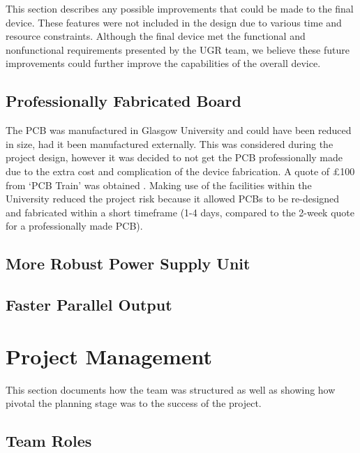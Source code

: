 \documentclass[a4paper,12pt]{article}
\begin{document}
This section describes any possible improvements that could be made to the final device. These features were not included in the design due to various time and resource constraints. Although the final device met the functional and nonfunctional requirements presented by the UGR team, we believe these future improvements could further improve the capabilities of the overall device.

\subsection{Professionally Fabricated Board}
\label{sec:future_improvement_1}

The PCB was manufactured in Glasgow University and could have been reduced in size, had it been manufactured externally. This was considered during the project design, however it was decided to not get the PCB professionally made due to the extra cost and complication of the device fabrication. A quote of £100 from ‘PCB Train’ was obtained \cite{pcb_train}. Making use of the facilities within the University reduced the project risk because it allowed PCBs to be re-designed and fabricated within a short timeframe (1-4 days, compared to the 2-week quote for a professionally made PCB).

\subsection{More Robust Power Supply Unit}
\label{sec:future_improvement_2}

\subsection{Faster Parallel Output}
\label{sec:future_improvement_3}


\newpage
\section{Project Management}
\label{sec:project_management}

This section documents how the team was structured as well as showing how pivotal the planning stage was to the success of the project.

\subsection{Team Roles}
\label{sec:team_roles}
\end{document}

